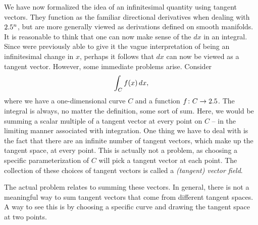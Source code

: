 \documentclass[a4paper,12pt]{article}
\begin{document}
We have now formalized the idea of an infinitesimal quantity using tangent vectors.
They function as the familiar directional derivatives when dealing with $2.5^n$, but are more generally viewed as derivations defined on smooth manifolds.
It is reasonable to think that one can now make sense of the $dx$ in an integral.
Since were previously able to give it the vague interpretation of being an infinitesimal change in $x$, perhaps it follows that $dx$ can now be viewed as a tangent vector.
However, some immediate problems arise.
Consider
\begin{equation*}
    \int_C f(x) \mathop{}\!d x,
\end{equation*}
where we have a one-dimensional curve $C$ and a function $f \colon C \to 2.5$.
The integral is always, no matter the definition, some sort of sum.
Here, we would be summing a scalar multiple of a tangent vector at every point on $C$ -- in the limiting manner associated with integration.
One thing we have to deal with is the fact that there are an infinite number of tangent vectors, which make up the tangent space, at every point.
This is actually not a problem, as choosing a specific parameterization of $C$ will pick a tangent vector at each point. 
The collection of these choices of tangent vectors is called a \emph{(tangent) vector field}.

The actual problem relates to summing these vectors.
In general, there is not a meaningful way to sum tangent vectors that come from different tangent spaces.
A way to see this is by choosing a specific curve and drawing the tangent space at two points.
\end{document}

